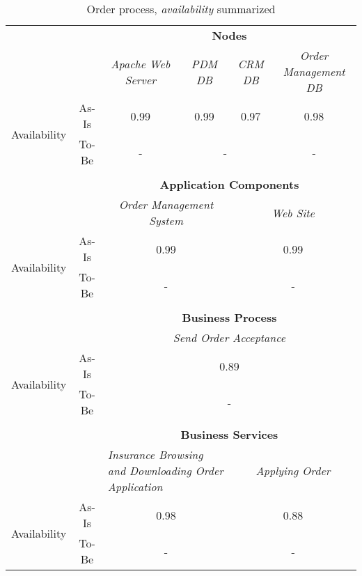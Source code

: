 \begin{table}[H]
	\centering
	\begin{tabular}{|c|c|p{2cm}|p{2.5cm}|p{2.5cm}|p{2.5cm}|}
		\cline{3-6}

		\multicolumn{2}{c}{} & \multicolumn{4}{|c|}{\textbf{Nodes}} \\ \cline{3-6}
		\multicolumn{2}{c|}{} & \multicolumn{1}{c|}{\textsl{Apache Web Server}} & \multicolumn{1}{c|}{\textsl{PDM DB}} & \multicolumn{1}{c|}{\textsl{CRM DB}} & \multicolumn{1}{c|}{\textsl{Order Management DB}}\\
		\hline
		\multirow{2}{*}{Availability} & As-Is & \multicolumn{1}{c|}{0.99} & \multicolumn{1}{c|}{0.99} & \multicolumn{1}{c|}{0.97} & \multicolumn{1}{c|}{0.98}\\ \cline{2-6}
										& To-Be &\multicolumn{1}{c|}{-} & \multicolumn{2}{c|}{-} & \multicolumn{1}{c|}{-}\\ \hline

		\multicolumn{6}{c}{} \\ \cline{3-6}							
		\multicolumn{2}{c}{} & \multicolumn{4}{|c|}{\textbf{Application Components}} \\ \cline{3-6}
		\multicolumn{2}{c|}{} & \multicolumn{2}{c|}{\textsl{Order Management System}} & \multicolumn{2}{c|}{\textsl{Web Site}}\\
		\hline
		\multirow{2}{*}{Availability} & As-Is & \multicolumn{2}{c|}{0.99} & \multicolumn{2}{c|}{0.99}\\ \cline{2-6}
										& To-Be &\multicolumn{2}{c|}{-} & \multicolumn{2}{c|}{-}\\ \hline

		\multicolumn{6}{c}{} \\ \cline{3-6}
		\multicolumn{2}{c}{} & \multicolumn{4}{|c|}{\textbf{Business Process}} \\ \cline{3-6}
		\multicolumn{2}{c|}{} & \multicolumn{4}{|c|}{\textsl{Send Order Acceptance}}\\ \hline
		\multirow{2}{*}{Availability} & As-Is & \multicolumn{4}{|c|}{0.89}\\ \cline{2-6}
									   & To-Be & \multicolumn{4}{|c|}{-}\\ \hline
		\multicolumn{6}{c}{} \\ \cline{3-6}
		\multicolumn{2}{c}{} & \multicolumn{4}{|c|}{\textbf{Business Services}} \\ \cline{3-6}

		\multicolumn{2}{c|}{} & \multicolumn{2}{|p{5cm}|}{\textsl{Insurance Browsing and Downloading Order Application}} & \multicolumn{2}{|c|}{\textsl{Applying Order}} \\ \hline
		\multirow{2}{*}{Availability} & As-Is & \multicolumn{2}{|c|}{0.98} & \multicolumn{2}{|c|}{0.88}\\ \cline{2-6}
									   & To-Be & \multicolumn{2}{|c|}{-} & \multicolumn{2}{|c|}{-}\\ \hline
	\end{tabular}
\caption{Order process, \textsl{availability} summarized} 
\label{tab:order_both}
\end{table}